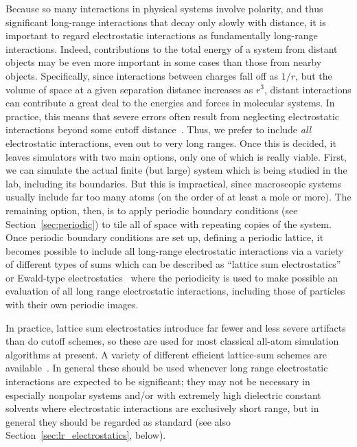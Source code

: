\documentclass[9pt,bestpractices]{livecoms}
\begin{document}
Because so many interactions in physical systems involve polarity, and thus significant long-range interactions that decay only slowly with distance, it is important to regard electrostatic interactions as fundamentally long-range interactions.
Indeed, contributions to the total energy of a system from distant objects may be even more important in some cases than those from nearby objects.
Specifically, since interactions between charges fall off as $1/r$, but the volume of space at a given separation distance increases as $r^3$, distant interactions can contribute a great deal to the energies and forces in molecular systems.
In practice, this means that severe errors often result from neglecting electrostatic interactions beyond some cutoff distance~\cite{LeachBook, York:1993:JChemPhys, Darden:1993:JChemPhys, Piana:2012:PLOSONE, Sagui:1999:AnnuRevBiophysBiomolStruct}.
Thus, we prefer to include \emph{all} electrostatic interactions, even out to very long ranges.
Once this is decided, it  leaves simulators with two main options, only one of which is really viable.
First, we can simulate the actual finite (but large) system which is being studied in the lab, including its boundaries.
But this is impractical, since macroscopic systems usually include far too many atoms (on the order of at least a mole or more).
The remaining option, then, is to apply periodic boundary conditions (see Section~\ref{sec:periodic}) to tile all of space with repeating copies of the system.
Once periodic boundary conditions are set up, defining a periodic lattice, it becomes possible to include all long-range electrostatic interactions via a variety of different types of sums which can be described as ``lattice sum electrostatics'' or Ewald-type electrostatics~\cite{Sagui:1999:AnnuRevBiophysBiomolStruct, Cisneros:2014:ChemRev} where the periodicity is used to make possible an evaluation of all long range electrostatic interactions, including those of particles with their own periodic images.

In practice, lattice sum electrostatics introduce far fewer and less severe artifacts than do cutoff schemes, so these are used for most classical all-atom simulation algorithms at present.
A variety of different efficient lattice-sum schemes are available~\cite{Cisneros:2014:ChemRev}.
In general these should be used whenever long range electrostatic interactions are expected to be significant; they may not be necessary in especially nonpolar systems and/or with extremely high dielectric constant solvents where electrostatic interactions are exclusively short range, but in general they should be regarded as standard (see also Section~\ref{sec:lr_electrostatics}, below).
\end{document}
